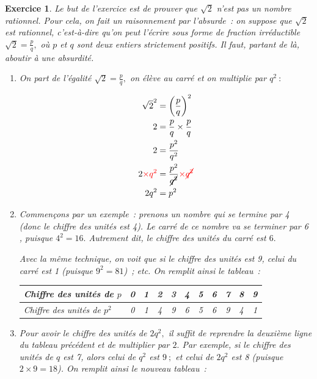 \documentclass[10pt]{article}
\newtheorem{exo}{Exercice}
\begin{document}
\begin{exo}

Le but de l'exercice est de prouver que  $\sqrt{2}$ n'est pas un nombre rationnel. Pour cela, on fait un raisonnement par l'absurde~: on suppose que $\sqrt{2}$ est rationnel, c'est-à-dire qu'on peut l'écrire sous forme de fraction irréductible $\sqrt{2}=\frac{p}{q},$ où $p$ et $q$ sont deux entiers strictement positifs. Il faut, partant de là, aboutir à une absurdité.

\begin{enumerate}
\item On part de l'égalité  $\sqrt{2}=\frac{p}{q},$ on élève au carré et on multiplie par $q^2~:$

\begin{align*}
\sqrt{2}^2&=\left(\frac{p}{q}\right)^2\\
2&=\frac{p}{q}\times \frac{p}{q}\\
2&=\frac{p^2}{q^2}\\
2\textcolor{red}{\times q^2}&=\frac{p^2}{\cancel{q^2}}\textcolor{red}{\times \cancel{q^2}}\\
2q^2&=p^2
\end{align*}
\item Commençons par un exemple~: prenons un nombre qui \og se termine par 4 \fg~{} (donc le chiffre des unités est 4). Le carré de ce nombre va \og se terminer par 6 \fg, puisque $4^2=16.$ Autrement dit, le chiffre des unités du carré est $6.$

Avec la même technique, on voit que si le chiffre des unités est 9, celui du carré est 1 (puisque $9^2=81$)~; etc. On remplit ainsi le tableau~:

\begin{center}
\begin{tabular}{|l|c|c|c|c|c|c|c|c|c|c|}
\hline
   Chiffre des unités de $p$ &0&1&2&3&4&5&6&7&8&9 \\
	\hline
	Chiffre des unités de $p^2$ &0&1&4&9&6&5&6&9&4&1 \\
	\hline
\end{tabular}
\end{center}
\item Pour avoir le chiffre des unités de $2q^2,$ il suffit de reprendre la deuxième ligne du tableau précédent et de multiplier par $2.$ Par exemple, si le chiffre des unités de $q$ est 7, alors celui de $q^2$ est $9~;$ et celui de $2q^2$ est 8 (puisque $2\times 9=18$). On remplit ainsi le nouveau tableau~:


\end{enumerate}
\end{exo}
\end{document}
